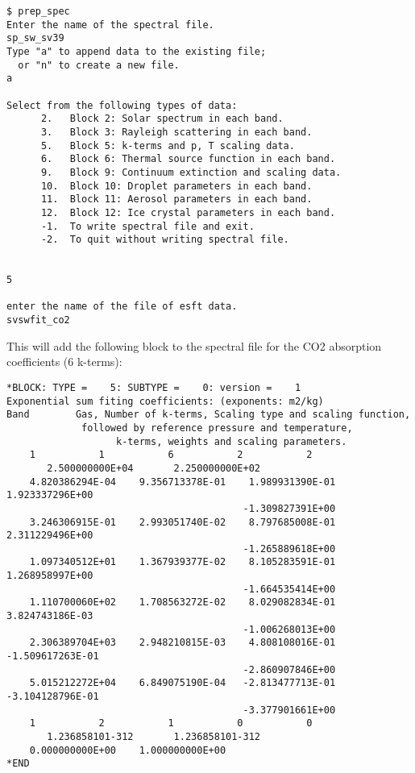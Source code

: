 {\small
\begin{verbatim}
$ prep_spec
Enter the name of the spectral file.
sp_sw_sv39
Type "a" to append data to the existing file;
  or "n" to create a new file.
a

Select from the following types of data:
      2.   Block 2: Solar spectrum in each band.
      3.   Block 3: Rayleigh scattering in each band.
      5.   Block 5: k-terms and p, T scaling data.
      6.   Block 6: Thermal source function in each band.
      9.   Block 9: Continuum extinction and scaling data.
      10.  Block 10: Droplet parameters in each band.
      11.  Block 11: Aerosol parameters in each band.
      12.  Block 12: Ice crystal parameters in each band.
      -1.  To write spectral file and exit.
      -2.  To quit without writing spectral file.


5

enter the name of the file of esft data.
svswfit_co2
\end{verbatim}
}

This will add the following block to the spectral file for the CO2
absorption coefficients (6 k-terms):

{\small
\begin{verbatim}
*BLOCK: TYPE =    5: SUBTYPE =    0: version =    1
Exponential sum fiting coefficients: (exponents: m2/kg)
Band        Gas, Number of k-terms, Scaling type and scaling function,
             followed by reference pressure and temperature,
                   k-terms, weights and scaling parameters.
    1           1           6           2           2
       2.500000000E+04       2.250000000E+02
    4.820386294E-04    9.356713378E-01    1.989931390E-01    1.923337296E+00
                                         -1.309827391E+00
    3.246306915E-01    2.993051740E-02    8.797685008E-01    2.311229496E+00
                                         -1.265889618E+00
    1.097340512E+01    1.367939377E-02    8.105283591E-01    1.268958997E+00
                                         -1.664535414E+00
    1.110700060E+02    1.708563272E-02    8.029082834E-01    3.824743186E-03
                                         -1.006268013E+00
    2.306389704E+03    2.948210815E-03    4.808108016E-01   -1.509617263E-01
                                         -2.860907846E+00
    5.015212272E+04    6.849075190E-04   -2.813477713E-01   -3.104128796E-01
                                         -3.377901661E+00
    1           2           1           0           0
       1.236858101-312       1.236858101-312
    0.000000000E+00    1.000000000E+00
*END
\end{verbatim}
}
